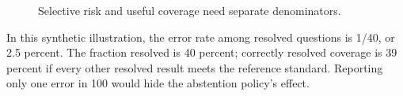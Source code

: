 \begin{figure}[H]
\centering
{}
\caption{Selective risk and useful coverage need separate denominators.}\label{fig:teach-M09-05}
\end{figure}

In this synthetic illustration, the error rate among resolved questions is 1/40, or 2.5 percent. The fraction resolved is 40 percent; correctly resolved coverage is 39 percent if every other resolved result meets the reference standard. Reporting only one error in 100 would hide the abstention policy's effect.


